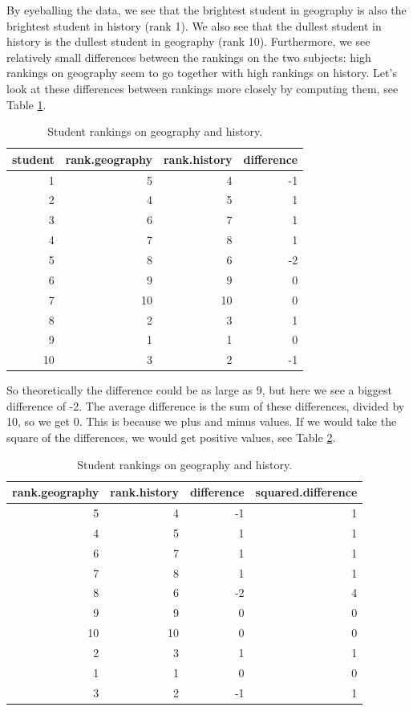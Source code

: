 \documentclass[]{report}\usepackage[]{graphicx}\usepackage[]{color}
\begin{document}
By eyeballing the data, we see that the brightest student in geography is also the brightest student in history (rank 1). We also see that the dullest student in history is the dullest student in geography (rank 10). Furthermore, we see relatively small differences between the rankings on the two subjects: high rankings on geography seem to go together with high rankings on history. Let's look at these differences between rankings more closely by computing them, see Table \ref{tab:nonpar_4}.

\begin{table}[ht]
\centering
\caption{Student rankings on geography and history.} 
\label{tab:nonpar_4}
\begin{tabular}{rrrr}
  \hline
student & rank.geography & rank.history & difference \\ 
  \hline
1 & 5 & 4 & -1 \\ 
  2 & 4 & 5 & 1 \\ 
  3 & 6 & 7 & 1 \\ 
  4 & 7 & 8 & 1 \\ 
  5 & 8 & 6 & -2 \\ 
  6 & 9 & 9 & 0 \\ 
  7 & 10 & 10 & 0 \\ 
  8 & 2 & 3 & 1 \\ 
  9 & 1 & 1 & 0 \\ 
  10 & 3 & 2 & -1 \\ 
   \hline
\end{tabular}
\end{table}


So theoretically the difference could be as large as 9, but here we see a biggest difference of -2. The average difference is the sum of these differences, divided by 10, so we get 0. This is because we plus and minus values. If we would take the square of the differences, we would get positive values, see Table \ref{tab:nonpar_5}.

\begin{table}[ht]
\centering
\caption{Student rankings on geography and history.} 
\label{tab:nonpar_5}
\begin{tabular}{rrrr}
  \hline
rank.geography & rank.history & difference & squared.difference \\ 
  \hline
5 & 4 & -1 & 1 \\ 
  4 & 5 & 1 & 1 \\ 
  6 & 7 & 1 & 1 \\ 
  7 & 8 & 1 & 1 \\ 
  8 & 6 & -2 & 4 \\ 
  9 & 9 & 0 & 0 \\ 
  10 & 10 & 0 & 0 \\ 
  2 & 3 & 1 & 1 \\ 
  1 & 1 & 0 & 0 \\ 
  3 & 2 & -1 & 1 \\ 
   \hline
\end{tabular}
\end{table}
\end{document}
